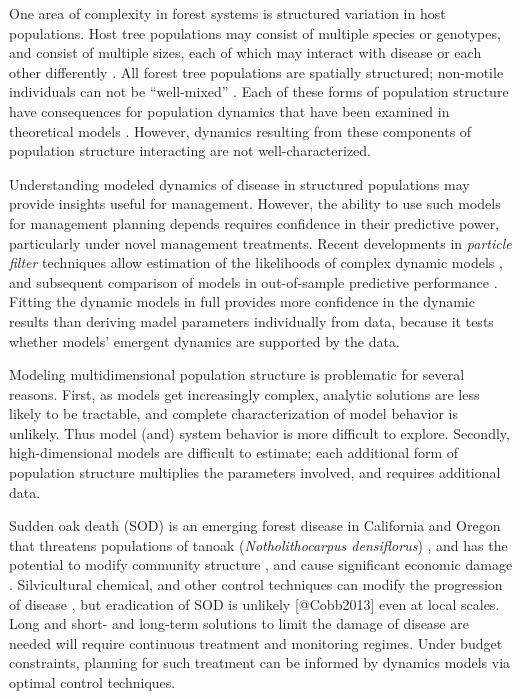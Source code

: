 \documentclass[english,nohyper,nofonts,nobib,nols,twoside]{tufte-handout}
\renewcommand\citep\cite
\begin{document}
One area of complexity in forest systems is structured variation in host
populations. Host tree populations may consist of multiple species or
genotypes, and consist of multiple sizes, each of which may interact
with disease or each other differently \citep{Gilbert1996}. All forest
tree populations are spatially structured; non-motile individuals can
not be ``well-mixed'' \citep{Filipe2003}. Each of these forms of
population structure have consequences for population dynamics that have
been examined in theoretical models
\citep{Dobson2004, Klepac2010, Park2001, Park2002}. However, dynamics
resulting from these components of population structure interacting are
not well-characterized.

Understanding modeled dynamics of disease in structured populations may
provide insights useful for management. However, the ability to use such
models for management planning depends requires confidence in their
predictive power, particularly under novel management treatments. Recent
developments in \emph{particle filter} techniques allow estimation of
the likelihoods of complex dynamic models
\citep{Arulampalam2002, Ionides2006, Knape2012}, and subsequent
comparison of models in out-of-sample predictive performance
\citep{Vehtari2012}. Fitting the dynamic models in full provides more
confidence in the dynamic results than deriving madel parameters
individually from data, because it tests whether models' emergent
dynamics are supported by the data.

Modeling multidimensional population structure is problematic for
several reasons. First, as models get increasingly complex, analytic
solutions are less likely to be tractable, and complete characterization
of model behavior is unlikely. Thus model (and) system behavior is more
difficult to explore. Secondly, high-dimensional models are difficult to
estimate; each additional form of population structure multiplies the
parameters involved, and requires additional data.

Sudden oak death (SOD) is an emerging forest disease in California and
Oregon that threatens populations of tanoak (\emph{Notholithocarpus
densiflorus}) \citep{Rizzo2003}, and has the potential to modify
community structure \citep{Metz2012}, and cause significant economic
damage \citep{Kovacs2011}. Silvicultural chemical, and other control
techniques can modify the progression of disease \citep{Swiecki2013},
but eradication of SOD is unlikely {[}@Cobb2013{]} even at local scales.
Long and short- and long-term solutions to limit the damage of disease
are needed will require continuous treatment and monitoring regimes.
Under budget constraints, planning for such treatment can be informed by
dynamics models via optimal control techniques.
\end{document}
